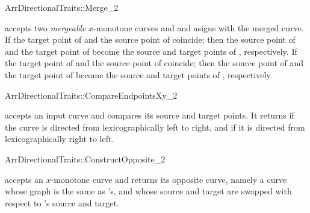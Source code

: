 \ccRefPageBegin
\begin{ccRefConcept}{ArrDirectionalTraits::Merge_2}

\ccHasModels{}

\def\ccTagRmConstRefPair{\ccFalse}%
  {accepts two \emph{mergeable} $x$-monotone curves  and
   and asigns  with the merged curve. If the target
  point of  and the source point of  coincide; then
  the source point of  and the target point of  become
  the source and target points of , respectively. If the target
  point of  and the source point of  coincide; then
  the source point of  and the target point of  become
  the source and target points of , respectively.
  }
\ccTagDefaults
\end{ccRefConcept}
\ccRefPageEnd

\ccRefPageBegin
\begin{ccRefConcept}{ArrDirectionalTraits::CompareEndpointsXy_2}

\ccHasModels{}

\def\ccTagRmConstRefPair{\ccFalse}%
  {accepts an input curve  and compares its source and target
  points. It returns  if the curve is directed from
  lexicographically left to right, and  if it is directed
  from lexicographically right to left.}

\ccTagDefaults
\end{ccRefConcept}
\ccRefPageEnd

\ccRefPageBegin
\begin{ccRefConcept}{ArrDirectionalTraits::ConstructOpposite_2}

\ccHasModels{}

\def\ccTagRmConstRefPair{\ccFalse}%
  {accepts an $x$-monotone curve  and returns its opposite curve,
  namely a curve whose graph is the same as 's, and whose source and
  target are swapped with respect to 's source and target.}

\ccTagDefaults
\end{ccRefConcept}
\ccRefPageEnd
